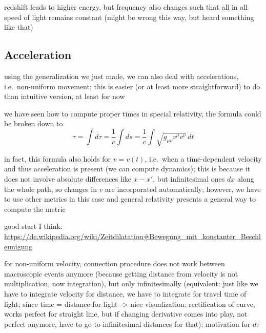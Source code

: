redshift leads to higher energy, but frequency also changes such that all in all speed of light remains constant (might be wrong this way, but heard something like that)




		\subsection{Acceleration}%
using the generalization we just made, we can also deal with accelerations, i.e.~non-uniform movement; this is easier (or at least more straightforward) to do than intuitive version, at least for now



we have seen how to compute proper times in special relativity, the formula could be broken down to 
\begin{equation}
\tau = \int d\tau = \frac{1}{c} \int ds = \frac{1}{c} \int \sqrt{g_{\mu \nu} v^\mu v^\nu} \, dt
\end{equation}

in fact, this formula also holds for $v = v(t)$, i.e.~when a time-dependent velocity and thus acceleration is present (we can compute dynamics); this is because it does not involve absolute differences like $x - x'$, but infinitesimal ones $dx$ along the whole path, so changes in $v$ are incorporated automatically; however, we have to use other metrics in this case and general relativity presents a general way to compute the metric



good start I think: \url{https://de.wikipedia.org/wiki/Zeitdilatation#Bewegung_mit_konstanter_Beschleunigung}




for non-uniform velocity, connection procedure does not work between macroscopic events anymore (because getting distance from velocity is not multiplication, now integration), but only infinitesimally (equivalent: just like we have to integrate velocity for distance, we have to integrate for travel time of light; since time = distance for light -> nice visualization: rectification of curve, works perfect for straight line, but if changing derivative comes into play, not perfect anymore, have to go to infinitesimal distances for that); motivation for $d\tau$





